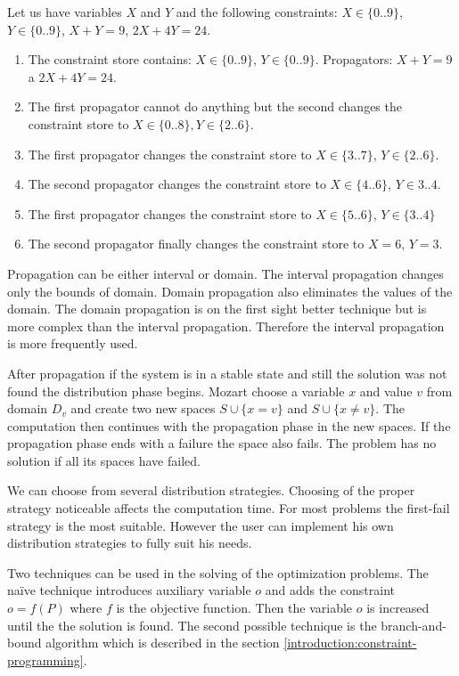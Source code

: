 \begin{example} Let us have variables $X$ and $Y$ and the following constraints: $X \in \{0..9\}$, $Y \in \{0..9\}$, 
  $X+Y = 9$, $2X + 4Y = 24$. 
\begin{enumerate}
  \item The constraint store contains: $X \in \{0..9\}$, $Y \in \{0..9\}$. Propagators: $X+Y = 9$ a $2X + 4Y = 24$.
  \item	The first propagator cannot do anything but the second changes the constraint store to $X \in \{0..8\}, Y \in \{2..6\}$.
  \item	The first propagator changes the constraint store to $X \in \{3..7\}$, $Y \in \{2..6\}$.
  \item	The second propagator changes the constraint store to $X \in \{4..6\}$, $Y \in 3..4$.
  \item	The first propagator changes the constraint store to $X \in \{5..6\}$, $Y \in \{3..4\}$
  \item	The second propagator finally changes the constraint store to $X = 6$, $Y = 3$.
\end{enumerate}
\end{example}

Propagation can be either interval or domain. The interval propagation changes only 
the bounds of domain. Domain propagation also eliminates the values of the domain.
The domain propagation is on the first sight better technique but is more complex
than the interval propagation. Therefore the interval propagation is more frequently used.

After propagation if the system is in a stable state and still the solution was not found
the distribution phase begins. Mozart choose a variable $x$ and value $v$ from domain
 $D_v$ and create two new spaces $S \cup \{x = v\}$ and $S \cup \{x \neq v\}$.
 The computation then continues with the propagation phase in the new spaces.
 If the propagation phase ends with a failure the space also fails. The problem has no
 solution if all its spaces have failed.

We can choose from several distribution strategies. Choosing of the proper strategy 
noticeable affects the computation time.  For most problems the first-fail strategy is
the most suitable. However the user can implement his own distribution strategies to fully
suit his needs.

Two techniques can be used in the solving of the optimization problems. The na\"{i}ve 
technique introduces auxiliary variable $o$ and adds the constraint $o = f(P)$ where $f$ is the
objective function. Then the variable $o$ is increased until the the solution is found. The second possible
technique is the branch-and-bound algorithm which is described in the section \ref{introduction:constraint-programming}.

